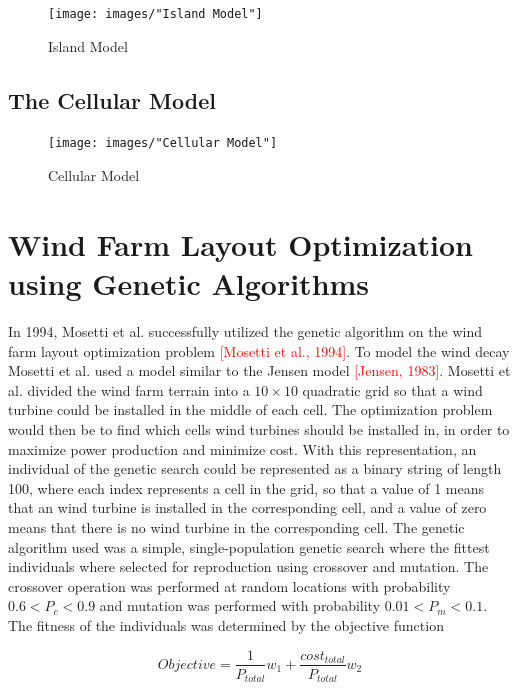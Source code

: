 \begin{figure}[h!]
\begin{center}
\texttt{[image: images/"Island Model"]}
\caption{Island Model}
\end{center}
\label{Island Model}
\end{figure}


\subsection{The Cellular Model}


\begin{figure}[h!]
\begin{center}
\texttt{[image: images/"Cellular Model"]}
\caption{Cellular Model}
\end{center}
\label{Cellular Model}
\end{figure}


\section{Wind Farm Layout Optimization using Genetic Algorithms}

In 1994, Mosetti et al. successfully utilized the genetic algorithm on the wind farm layout optimization problem \textcolor{red}{[Mosetti et al., 1994]}. To model the wind decay Mosetti et al. used a model similar to the Jensen model \textcolor{red}{[Jensen, 1983]}. Mosetti et al. divided the wind farm terrain into a $10\times10$ quadratic grid so that a wind turbine could be installed in the middle of each cell. The optimization problem would then be to find which cells wind turbines should be installed in, in order to maximize power production and minimize cost. With this representation, an individual of the genetic search could be represented as a binary string of length 100, where each index represents a cell in the grid, so that a value of 1 means that an wind turbine is installed in the corresponding cell, and a value of zero means that there is no wind turbine in the corresponding cell. The genetic algorithm used was a simple, single-population genetic search where the fittest individuals where selected for reproduction using crossover and mutation. The crossover operation was performed at random locations with probability $0.6 < P_c < 0.9$ and mutation was performed with probability $0.01 < P_m < 0.1$. The fitness of the individuals was determined by the objective function

\begin{equation}
Objective = \frac{1}{P_{total}}w_1 + \frac{cost_{total}}{P_{total}}w_2
\label{Objective function Mosetti et al.}
\end{equation}

